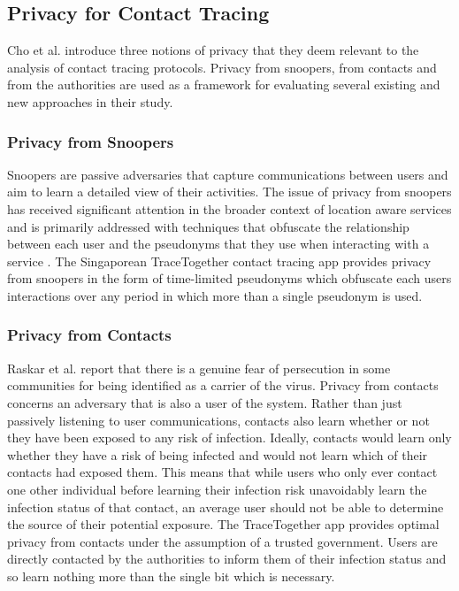 \documentclass{article}
\begin{document}
\subsection{Privacy for Contact Tracing}\label{sec:privacy_terms}
Cho et al. \cite{DBLP:journals/corr/abs-2003-11511} introduce three notions of privacy that they deem relevant to the analysis of contact tracing protocols. Privacy from snoopers, from contacts and from the authorities are used as a framework for evaluating several existing and new approaches in their study. 

\subsubsection*{Privacy from Snoopers}
Snoopers are passive adversaries that capture communications between users and aim to learn a detailed view of their activities. The issue of privacy from snoopers has received significant attention in the broader context of location aware services \cite{v2x_pseudo_survey} and is primarily addressed with techniques that obfuscate the relationship between each user and the pseudonyms that they use when interacting with a service \cite{stajano_mix_zones}. The Singaporean TraceTogether contact tracing app provides privacy from snoopers in the form of time-limited pseudonyms which obfuscate each users interactions over any period in which more than a single pseudonym is used. 

\subsubsection*{Privacy from Contacts}
Raskar et al. \cite{raskar2020apps} report that there is a genuine fear of persecution in some communities for being identified as a carrier of the virus. Privacy from contacts concerns an adversary that is also a user of the system. Rather than just passively listening to user communications, contacts also learn whether or not they have been exposed to any risk of infection. Ideally, contacts would learn only whether they have a risk of being infected and would not learn which of their contacts had exposed them. This means that while users who only ever contact one other individual before learning their infection risk unavoidably learn the infection status of that contact, an average user should not be able to determine the source of their potential exposure. The TraceTogether app provides optimal privacy from contacts under the assumption of a trusted government. Users are directly contacted by the authorities to inform them of their infection status and so learn nothing more than the single bit which is necessary. 
\end{document}
